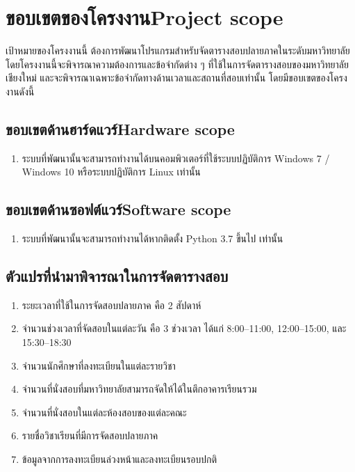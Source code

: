 \section{\ifcpe ขอบเขตของโครงงาน\else Project scope\fi}
เป้าหมายของโครงงานนี้ ต้องการพัฒนาโปรแกรมสำหรับจัดตารางสอบปลายภาคในระดับมหาวิทยาลัย
โดยโครงงานนี้จะพิจารณาความต้องการและข้อจำกัดต่าง ๆ ที่ใช้ในการจัดตารางสอบของมหาวิทยาลัยเชียงใหม่
และจะพิจารณาเฉพาะข้อจำกัดทางด้านเวลาและสถานที่สอบเท่านั้น โดยมีขอบเขตของโครงงานดังนี้ 
\subsection{\ifcpe ขอบเขตด้านฮาร์ดแวร์\else Hardware scope\fi}
\begin{enumerate}
    \item ระบบที่พัฒนานั้นจะสามารถทำงานได้บนคอมพิวเตอร์ที่ใช้ระบบปฏิบัติการ Windows 7 / Windows 10 หรือระบบปฏิบัติการ Linux เท่านั้น
\end{enumerate}
\subsection{\ifcpe ขอบเขตด้านซอฟต์แวร์\else Software scope\fi}
\begin{enumerate}
    \item ระบบที่พัฒนานั้นจะสามารถทำงานได้หากติดตั้ง Python 3.7 ขึ้นไป เท่านั้น 
\end{enumerate}
\subsection{ตัวแปรที่นำมาพิจารณาในการจัดตารางสอบ}
\begin{enumerate}
    \item ระยะเวลาที่ใช้ในการจัดสอบปลายภาค คือ 2 สัปดาห์
    \item จำนวนช่วงเวลาที่จัดสอบในแต่ละวัน คือ 3 ช่วงเวลา ได้แก่ 8:00--11:00, 12:00--15:00, 
    และ 15:30--18:30
    \item จำนวนนักศึกษาที่ลงทะเบียนในแต่ละรายวิชา
    \item จำนวนที่นั่งสอบที่มหาวิทยาลัยสามารถจัดให้ได้ในตึกอาคารเรียนรวม
    \item จำนวนที่นั่งสอบในแต่ละห้องสอบของแต่ละคณะ
    \item รายชื่อวิชาเรียนที่มีการจัดสอบปลายภาค
    \item ข้อมูลจากการลงทะเบียนล่วงหน้าและลงทะเบียนรอบปกติ
\end{enumerate}

